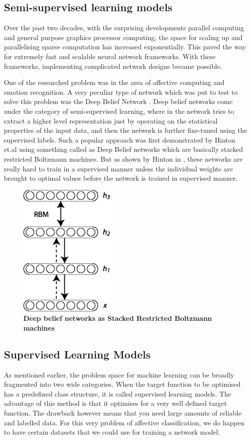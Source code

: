 \subsection{ Semi-supervised learning models }
Over the past two decades, with the surprising developments parallel computing and general purpose graphics processor computing, the space for scaling up and parallelising sparse computation has increased exponentially. This paved the way for extremely fast and scalable neural network frameworks. With these frameworks, implementing complicated network designs became possible.
\par
One of the researched problem was in the area of affective computing and emotion recognition. A very peculiar type of network which was put to test to solve this problem was the Deep Belief Network \cite{Hinton:2006} . Deep belief networks come under the category of semi-supervised learning, where in the network tries to extract a higher level representation just by operating on the statistical properties of the input data, and then the network is further fine-tuned using the supervised labels. Such a popular approach was first demonstrated by Hinton et.al \cite{Hinton:2006} using something called as Deep Belief networks which are basically stacked restricted Boltzmann machines. But as shown by Hinton in \cite{Hinton2} , these networks are really hard to train in a supervised manner unless the individual weights are brought to optimal values before the network is trained in supervised manner.

\begin{figure}
\centering
\includegraphics[scale=0.8]{figures/DBN3}
\caption{\textbf{Deep belief networks as Stacked Restricted Boltzmann machines}}
\label{fig:FACSAU}
\end{figure}

\subsection{ Supervised Learning Models}
As mentioned earlier, the problem space for machine learning can be broadly fragmented into two wide categories. When the target function to be optimised has a predefined class structure, it is called supervised learning models. The advantage of this method is that it optimises for a very well defined target function. The drawback however means that you need large amounts of reliable and labelled data. For this very problem of affective classification, we do happen to have certain datasets that we could use for training a network model. 